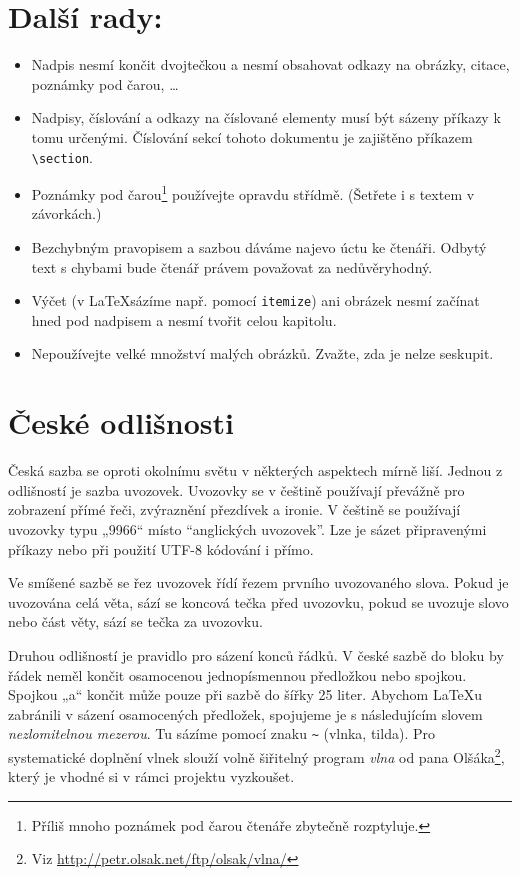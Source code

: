 \documentclass[10pt,twocolumn,a4paper]{article}
\begin{document}
\section{Další rady:}

\begin{itemize}
    \item Nadpis nesmí končit dvojtečkou a nesmí obsahovat odkazy na obrázky, citace, poznámky pod čarou, \dots
    \item Nadpisy, číslování a odkazy na číslované elementy musí být sázeny příkazy k tomu určenými.
Číslování sekcí tohoto dokumentu je zajištěno příkazem \texttt{\textbackslash section}.
    \item Poznámky pod čarou\footnote{Příliš mnoho poznámek pod čarou čtenáře zbytečně rozptyluje.} používejte opravdu střídmě.
(Šetřete i s textem v závorkách.)
    \item Bezchybným pravopisem a sazbou dáváme najevo úctu ke čtenáři.
Odbytý text s chybami bude čtenář právem považovat za nedůvěryhodný.
    \item Výčet (v \LaTeX \space sázíme např. pomocí \texttt{itemize}) ani obrázek nesmí začínat hned pod nadpisem a nesmí tvořit celou kapitolu.
    \item Nepoužívejte velké množství malých obrázků.
Zvažte, zda je nelze seskupit.
\end{itemize}

\section{České odlišnosti}

Česká sazba se oproti okolnímu světu v některých aspektech mírně liší.
Jednou z odlišností je sazba uvozovek.
Uvozovky se v češtině používají převážně pro zobrazení přímé řeči, zvýraznění přezdívek a ironie.
V češtině se používají uvozovky typu „9966“ místo ``anglických uvozovek''.
Lze je sázet připravenými příkazy nebo při použití UTF-8 kódování i přímo.

Ve smíšené sazbě se řez uvozovek řídí řezem prvního uvozovaného slova.
Pokud je uvozována celá věta, sází se koncová tečka před uvozovku, pokud se uvozuje slovo nebo část věty, sází se tečka za uvozovku.

Druhou odlišností je pravidlo pro sázení konců řádků.
V české sazbě do bloku by řádek neměl končit osamocenou jednopísmennou předložkou nebo spojkou.
Spojkou „a“ končit může pouze při sazbě do šířky 25 liter.
Abychom \LaTeX u zabránili v sázení osamocených předložek, spojujeme je s následujícím slovem \textit{nezlomitelnou mezerou}.
Tu sázíme pomocí znaku \texttt{\textasciitilde} (vlnka, tilda).
Pro systematické doplnění vlnek slouží volně šiřitelný program \textit{vlna} od pana Olšáka\footnote{Viz \url{http://petr.olsak.net/ftp/olsak/vlna/}}, který je vhodné si v rámci projektu vyzkoušet.
\end{document}
